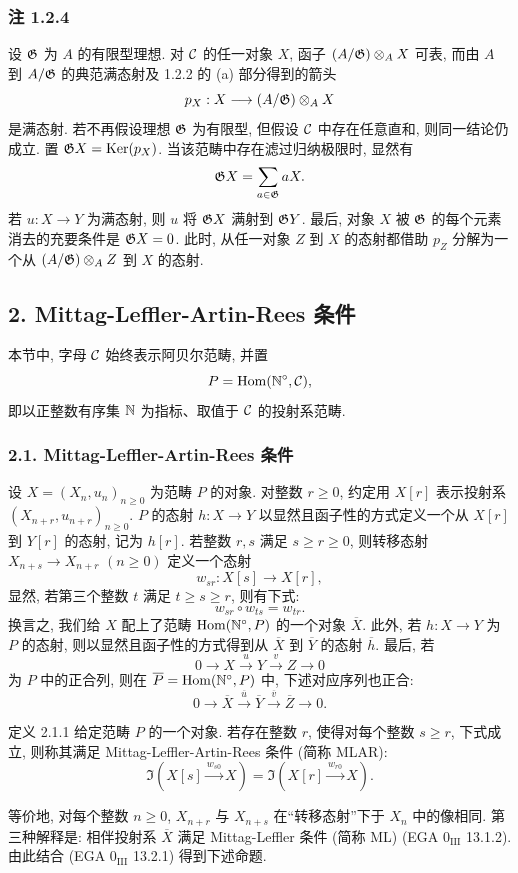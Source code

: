 \subsubsection*{注 1.2.4}
设 $\mathfrak G$ 为 $A$ 的有限型理想. 对 $\mathcal C$ 的任一对象 $X$, 函子 $(A/\mathfrak G)\otimes_A X$ 可表, 而由 $A$ 到 $A/\mathfrak G$ 的典范满态射及 1.2.2 的 (a) 部分得到的箭头
\[
p_X:X\longrightarrow (A/\mathfrak G)\otimes_A X
\]
是满态射. 若不再假设理想 $\mathfrak G$ 为有限型, 但假设 $\mathcal C$ 中存在任意直和, 则同一结论仍成立. 置 $\mathfrak G X=\operatorname{Ker}(p_X)$. 当该范畴中存在滤过归纳极限时, 显然有
\[
\mathfrak G X=\sum_{a\in\mathfrak G}aX.
\]
若 $u:X\to Y$ 为满态射, 则 $u$ 将 $\mathfrak G X$ 满射到 $\mathfrak G Y$. 最后, 对象 $X$ 被 $\mathfrak G$ 的每个元素消去的充要条件是 $\mathfrak G X=0$. 此时, 从任一对象 $Z$ 到 $X$ 的态射都借助 $p_Z$ 分解为一个从 $(A/\mathfrak G)\otimes_A Z$ 到 $X$ 的态射.

\subsection*{2. Mittag-Leffler-Artin-Rees 条件}
本节中, 字母 $\mathcal C$ 始终表示阿贝尔范畴, 并置
\[
P=\operatorname{Hom}(\mathbb N^\circ,\mathcal C),
\]
即以正整数有序集 $\mathbb N$ 为指标、取值于 $\mathcal C$ 的投射系范畴.

\subsubsection*{2.1. Mittag-Leffler-Artin-Rees 条件}
设 $X=(X_n,u_n)_{n\ge0}$ 为范畴 $P$ 的对象. 对整数 $r\ge0$, 约定用 $X[r]$ 表示投射系 $(X_{n+r},u_{n+r})_{n\ge0}$. $P$ 的态射 $h:X\to Y$ 以显然且函子性的方式定义一个从 $X[r]$ 到 $Y[r]$ 的态射, 记为 $h[r]$. 若整数 $r,s$ 满足 $s\ge r\ge0$, 则转移态射 $X_{n+s}\to X_{n+r}$ $(n\ge0)$ 定义一个态射
\[
w_{sr}:X[s]\longrightarrow X[r],
\]
显然, 若第三个整数 $t$ 满足 $t\ge s\ge r$, 则有下式:
\[
w_{sr}\circ w_{ts}=w_{tr}.
\]
换言之, 我们给 $X$ 配上了范畴 $\operatorname{Hom}(\mathbb N^\circ,P)$ 的一个对象 $\overline X$. 此外, 若 $h:X\to Y$ 为 $P$ 的态射, 则以显然且函子性的方式得到从 $\overline X$ 到 $\overline Y$ 的态射 $\overline h$. 最后, 若
\[
0\longrightarrow X\stackrel{u}{\longrightarrow}Y\stackrel{v}{\longrightarrow}Z\longrightarrow0
\]
为 $P$ 中的正合列, 则在 $\overline P=\operatorname{Hom}(\mathbb N^\circ,P)$ 中, 下述对应序列也正合:
\[
0\longrightarrow\overline X\stackrel{\overline u}{\longrightarrow}\overline Y\stackrel{\overline v}{\longrightarrow}\overline Z\longrightarrow0.
\]

\begin{statement}{定义 2.1.1}
给定范畴 $P$ 的一个对象. 若存在整数 $r$, 使得对每个整数 $s\ge r$, 下式成立, 则称其满足 Mittag-Leffler-Artin-Rees 条件 (简称 MLAR):
\[
\Im(X[s]\xrightarrow{w_{s0}}X)=\Im(X[r]\xrightarrow{w_{r0}}X).
\]
\end{statement}
等价地, 对每个整数 $n\ge0$, $X_{n+r}$ 与 $X_{n+s}$ 在``转移态射''下于 $X_n$ 中的像相同. 第三种解释是: 相伴投射系 $\overline X$ 满足 Mittag-Leffler 条件 (简称 ML) (EGA $0_{\mathrm{III}}$ 13.1.2). 由此结合 (EGA $0_{\mathrm{III}}$ 13.2.1) 得到下述命题.

